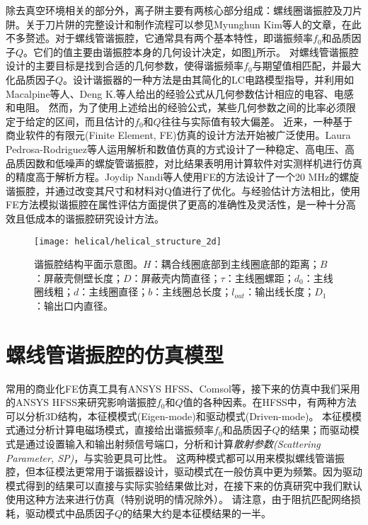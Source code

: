 除去真空环境相关的部分外，离子阱主要有两核心部分组成：螺线圈谐振腔及刀片阱。关于刀片阱的完整设计和制作流程可以参见Myunghun Kim等人\cite[]{Kim_Kim_Hong_Lee_Moon_Lee_Kim_Ha_Sim_Lee_2022}的文章，在此不多赘述。对于螺线管谐振腔，它通常具有两个基本特性，即谐振频率$f_0$和品质因子$Q$。它们的值主要由谐振腔本身的几何设计决定，如图\ref{fig:helical_structure_2d}所示。
对螺线管谐振腔设计的主要目标是找到合适的几何参数，使得谐振频率$f_0$与期望值相匹配，并最大化品质因子$Q$。设计谐振器的一种方法是由其简化的LC电路模型指导，并利用如Macalpine等人\cite[]{Macalpine_Schildknecht_1959}、Deng K.等人\cite[]{Deng_Sun_Yuan_Xu_Zhang_Lu_Luo_2014}给出的经验公式从几何参数估计相应的电容、电感和电阻。
然而，为了使用上述给出的经验公式，某些几何参数之间的比率必须限定于给定的区间，而且估计的$f_0$和$Q$往往与实际值有较大偏差。
近来，一种基于商业软件的有限元(Finite Element, FE)仿真的设计方法开始被广泛使用。Laura Pedrosa-Rodriguez等人\cite[]{Pedrosa_Rodriguez_Outerelo_Gomez_Alcala_de_Vicente_Diaz_Otero_2018}运用解析和数值仿真的方式设计了一种稳定、高电压、高品质因数和低噪声的螺旋管谐振腔，对比结果表明用计算软件对实测样机进行仿真的精度高于解析方程。Joydip Nandi等人\cite[]{Nandi_Sikdar_Reza_Misra_Das_Ray_2020}使用FE的方法设计了一个20 MHz的螺旋谐振腔，并通过改变其尺寸和材料对Q值进行了优化。与经验估计方法相比，使用FE方法模拟谐振腔在属性评估方面提供了更高的准确性及灵活性，是一种十分高效且低成本的谐振腔研究设计方法。

\begin{figure}
    \centering
    \caption[谐振腔结构平面示意图]{谐振腔结构平面示意图。$H$：耦合线圈底部到主线圈底部的距离；$B$：屏蔽壳侧壁长度；$D$：屏蔽壳内筒直径；$\tau$：主线圈螺距；$d_0$：主线圈线粗；$d$：主线圈直径；$b$：主线圈总长度；$l_{out}$：输出线长度；$D_1$：输出口内直径。\label{fig:helical_structure_2d}}
    \texttt{[image: helical/helical\_structure\_2d]}
\end{figure}

\section[螺线管谐振腔的仿真模型]{螺线管谐振腔的仿真模型}

常用的商业化FE仿真工具有ANSYS HFSS、Comsol等，接下来的仿真中我们采用的ANSYS HFSS来研究影响谐振腔$f_0$和$Q$值的各种因素。在HFSS中，有两种方法可以分析3D结构，本征模模式(Eigen-mode)和驱动模式(Driven-mode)。
本征模模式通过分析计算电磁场模式，直接给出谐振频率$f_0$和品质因子$Q$的结果；而驱动模式是通过设置输入和输出射频信号端口，分析和计算\emph{散射参数(Scattering Parameter, SP)}，与实验更具可比性。
这两种模式都可以用来模拟螺线管谐振腔，但本征模法更常用于谐振器设计，驱动模式在一般仿真中更为频繁。因为驱动模式得到的结果可以直接与实际实验结果做比对，在接下来的仿真研究中我们默认使用这种方法来进行仿真（特别说明的情况除外）。
请注意，由于阻抗匹配网络损耗\cite[]{Gandolfi_Niedermayr_Kumph_Brownnutt_Blatt_2012}，驱动模式中品质因子$Q$的结果大约是本征模结果的一半。

